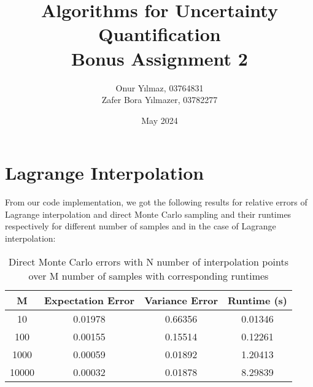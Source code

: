 \documentclass{article}
\title{Algorithms for Uncertainty Quantification\\
Bonus Assignment 2}
\author{Onur Yılmaz, 03764831 \\Zafer Bora Yılmazer, 03782277 }
\date{May 2024}
\begin{document}
\maketitle

\section{Lagrange Interpolation}
From our code implementation, we got the following results for relative errors of Lagrange interpolation and direct 
Monte Carlo sampling and their runtimes respectively for different number of samples and in the case of Lagrange 
interpolation:
\begin{table}[H]
    \centering
    \begin{tabular}{|c|c|c|c|}
    \hline
    \textbf{M} & \textbf{Expectation Error} & \textbf{Variance Error} & \textbf{Runtime (s)} \\ \hline
    10 & 0.01978 & 0.66356 & 0.01346 \\ \hline
    100 & 0.00155 & 0.15514 & 0.12261 \\ \hline
    1000 & 0.00059 & 0.01892 & 1.20413 \\ \hline
    10000 & 0.00032 & 0.01878 & 8.29839 \\ \hline
    \end{tabular}
    \caption{Direct Monte Carlo errors with N number of interpolation points over M number of samples with corresponding runtimes}
    \label{table:direct_mc}
    \end{table}
    
\end{document}
